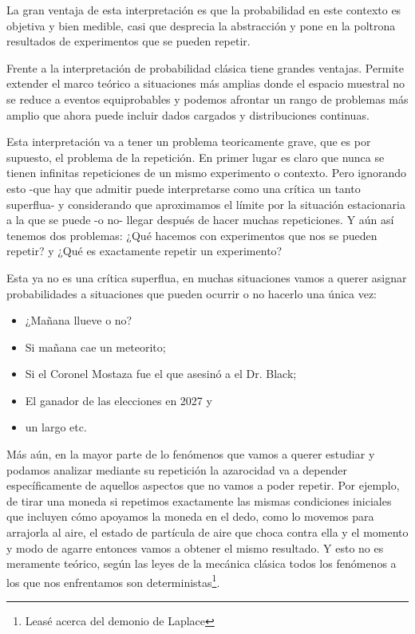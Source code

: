 La gran ventaja de esta interpretación es que la probabilidad en este contexto es objetiva y bien medible, casi que desprecia la abstracción y pone en la poltrona resultados de experimentos que se pueden repetir. 

Frente a la interpretación de probabilidad clásica tiene grandes ventajas. Permite extender el marco teórico a situaciones más amplias donde el espacio muestral no se reduce a eventos equiprobables y podemos afrontar un rango de problemas más amplio que ahora puede incluir dados cargados y distribuciones continuas.

Esta interpretación va a tener un problema teoricamente grave, que es por supuesto, el problema de la repetición. En primer lugar es claro que nunca se tienen infinitas repeticiones de un mismo experimento o contexto. Pero ignorando esto -que hay que admitir puede interpretarse como una crítica un tanto superflua- y considerando que aproximamos el límite por la situación estacionaria a la que se puede -o no- llegar después de hacer muchas repeticiones. Y aún así tenemos dos problemas: ¿Qué hacemos con experimentos que nos se pueden repetir? y ¿Qué es exactamente repetir un experimento?

Esta ya no es una crítica superflua, en muchas situaciones vamos a querer asignar probabilidades a situaciones que pueden ocurrir o no hacerlo una única vez:
\begin{itemize}
    \item ¿Mañana llueve o no?
    \item Si mañana cae un meteorito;
    \item Si el Coronel Mostaza fue el que asesinó a el Dr. Black;
    \item El ganador de las elecciones en 2027 y
    \item  un largo etc.
\end{itemize}

Más aún, en la mayor parte de lo fenómenos que vamos a querer estudiar y podamos analizar mediante su repetición la azarocidad va a depender específicamente de aquellos aspectos que no vamos a poder repetir. Por ejemplo, de tirar una moneda si repetimos exactamente las mismas condiciones iniciales que incluyen cómo apoyamos la moneda en el dedo, como lo movemos para arrajorla al aire, el estado de partícula de aire que choca contra ella y el momento y modo de agarre entonces vamos a obtener el mismo resultado. Y esto no es meramente teórico, según las leyes de la mecánica clásica todos los fenómenos a los que nos enfrentamos son deterministas\footnote{Leasé acerca del demonio de Laplace}.

